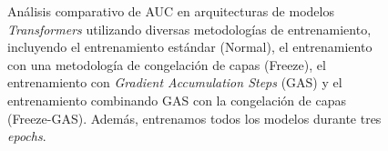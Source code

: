 \begin{figure}[H]
	\centering
	

	\caption[Comparación del AUC de modelos \textit{Transformers} entrenados con 3 \textit{epochs}]{Análisis comparativo de AUC en arquitecturas de modelos \textit{Transformers} utilizando diversas metodologías de entrenamiento, incluyendo el entrenamiento estándar (Normal), el entrenamiento con una metodología de congelación de capas (Freeze), el entrenamiento con \textit{Gradient Accumulation Steps} (GAS) y el entrenamiento combinando GAS con la congelación de capas (Freeze-GAS). Además, entrenamos todos los modelos durante tres \textit{epochs}.}
	\label{fig:comparison_3_3pochs}
\end{figure}

